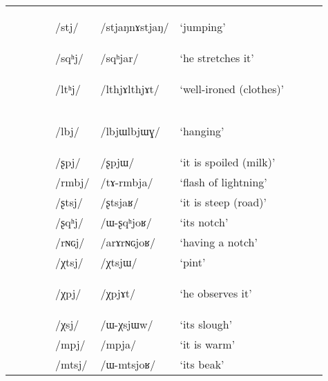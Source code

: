 \documentclass[12pt]{article}
\newcommand{\ipa}[1]{\mbox{\phon/#1/}}
\newcommand{\trois}[1]{\ipa{#1}\addtocounter{3clusters}{1}}
\newcommand{\tib}[1]{\cellcolor{lightgray}\textbf{#1}}
\newcommand{\idph}[1]{\cellcolor{gray}\textbf{#1}}
\newcommand{\resetcounters}[2]{
\newcounter{#1}
\newcounter{#2}
 \setcounter{#1}{\value{2clusters}}
  \setcounter{#2}{\value{3clusters}}
 \setcounter{2clusters}{0}
  \setcounter{3clusters}{0}
}
\begin{document}
\begin{landscape}
\begin{longtable}{llllllllll}
 & & & &\trois{stj}  \idph{} &\ipa{stjaŋnɤstjaŋ} & `jumping' \\
 & & & &\trois{sqʰj} &\ipa{sqʰjar} & `he stretches it' \\
 & & & &\trois{ltʰj}  \idph{} &\ipa{lthjɤlthjɤt} & `well-ironed (clothes)' \\
 & & & &\trois{lbj} \idph{} &\ipa{lbjɯlbjɯɣ} & `hanging' \\  
 & & & &\trois{ʂpj} &\ipa{ʂpjɯ} & `it is spoiled (milk)' \\
 & & & &\trois{rmbj} &\ipa{tɤ-rmbja} & `flash of lightning' \\
 & & & &\trois{ʂtsj} &\ipa{ʂtsjaʁ} & `it is steep (road)' \\
 & & & &\trois{ʂqʰj} &\ipa{ɯ-ʂqʰjoʁ} & `its notch' \\
 & & & &\trois{rɴɢj} &\ipa{arɤrɴɢjoʁ} & `having a notch' \\
 & & & &\trois{χtsj} &\ipa{χtsjɯ} & `pint' \\
 & & & &\trois{χpj} \tib{} &\ipa{χpjɤt} & `he  observes it' \\
 & & & &\trois{χsj} &\ipa{ɯ-χsjɯw} & `its slough' \\
 & & & &\trois{mpj} &\ipa{mpja} & `it is warm' \\
 & & & &\trois{mtsj} &\ipa{ɯ-mtsjoʁ} & `its beak' \\
\bottomrule
\end{longtable}
\end{landscape}
  \resetcounters{2Cjw}{3Cjw} %
\end{document}
